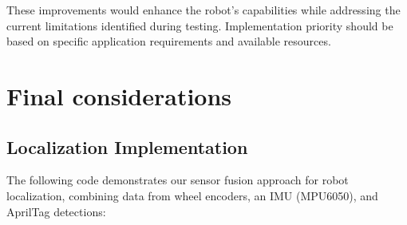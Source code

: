 \documentclass{article}
\begin{document}
These improvements would enhance the robot's capabilities while addressing the current limitations identified during testing. Implementation priority should be based on specific application requirements and available resources.

\newpage
\section{Final considerations}

\subsection{Localization Implementation}
The following code demonstrates our sensor fusion approach for robot localization, combining data from wheel encoders, an IMU (MPU6050), and AprilTag detections:
\end{document}
